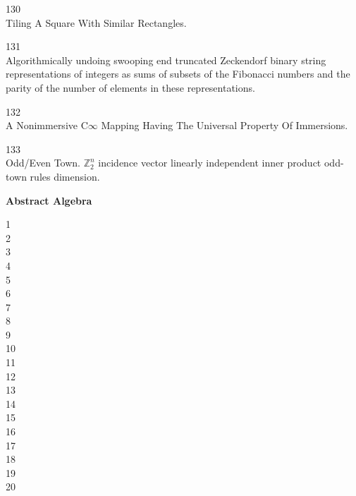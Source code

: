 130 \\
Tiling A Square With Similar Rectangles.

131 \\
Algorithmically undoing swooping end truncated Zeckendorf binary string representations of integers as sums of subsets of the Fibonacci numbers and the parity of the number of elements in these representations.

132 \\
A Nonimmersive C$\infty$ Mapping Having The Universal Property Of Immersions.

133 \\
Odd/Even Town. $\mathbb{Z}_2^n$ incidence vector linearly independent inner product odd-town rules dimension.

\newpage

\textbf{Abstract Algebra}

1 \\


2 \\


3 \\


4 \\


5 \\


6 \\


7 \\


8 \\


9 \\


10 \\


11 \\


12 \\


13 \\


14 \\


15 \\


16 \\


17 \\


18 \\


19 \\


20 \\


